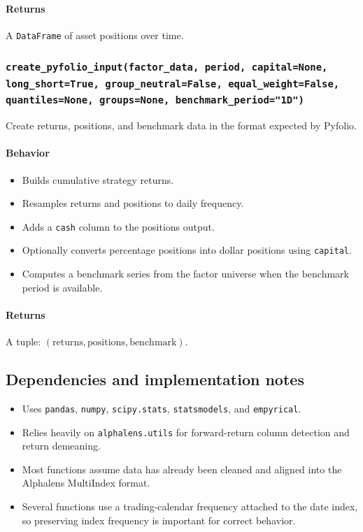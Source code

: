 \documentclass[11pt]{article}
\begin{document}
\paragraph{Returns}
A \texttt{DataFrame} of asset positions over time.

\subsubsection{\texttt{create\_pyfolio\_input(factor\_data, period, capital=None, long\_short=True, group\_neutral=False, equal\_weight=False, quantiles=None, groups=None, benchmark\_period="1D")}}
Create returns, positions, and benchmark data in the format expected by Pyfolio.

\paragraph{Behavior}
\begin{itemize}
  \item Builds cumulative strategy returns.
  \item Resamples returns and positions to daily frequency.
  \item Adds a \texttt{cash} column to the positions output.
  \item Optionally converts percentage positions into dollar positions using \texttt{capital}.
  \item Computes a benchmark series from the factor universe when the benchmark period is available.
\end{itemize}

\paragraph{Returns}
A tuple: \((\text{returns}, \text{positions}, \text{benchmark})\).

\subsection{Dependencies and implementation notes}

\begin{itemize}
  \item Uses \texttt{pandas}, \texttt{numpy}, \texttt{scipy.stats}, \texttt{statsmodels}, and \texttt{empyrical}.
  \item Relies heavily on \texttt{alphalens.utils} for forward-return column detection and return demeaning.
  \item Most functions assume data has already been cleaned and aligned into the Alphalens MultiIndex format.
  \item Several functions use a trading-calendar frequency attached to the date index, so preserving index frequency is important for correct behavior.
\end{itemize}
\end{document}
